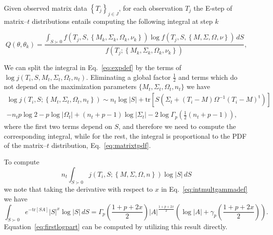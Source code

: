 \documentclass[english,listof=totoc]{scrartcl}
\begin{document}
Given observed matrix data $\left\{T_j\right\}_{j\in J}$, for each observation $T_j$ the E-step of matrix--$t$ distributions entails computing the following integral at step $k$

\begin{equation}
Q(\theta,\theta_k)=\frac{\int_{S\succ 0}f(T_{j},S,\left\{M_k,\Sigma_k,\Omega_k,\nu_k\right\})\log f\left(T_{j},S,\left\{M,\Sigma,\Omega,\nu\right\}\right)\,dS}{f(T_j;\left\{M_k,\Sigma_k,\Omega_k,\nu_k\right\})},\label{eq:expdef}
\end{equation}

We can split the integral in Eq.~\eqref{eq:expdef} by the terms of $\log j(T_{i},S,M_{t},\Sigma_{t},\Omega_{t},n_{t})$. Eliminating a global factor $\frac{1}{2}$ and terms which do not depend on the
maximization parameters $\{M_{t},\Sigma_{t},\Omega_{t},n_{t}\}$ we have
\begin{equation}
\begin{split}\log j(T_{i},S;\left\{M_{t},\Sigma_{t},\Omega_{t},n_{t}\right\})\sim n_{t}\log|S|+\textrm{tr}\left[S(\Sigma_{t}+(T_{i}-M)\Omega^{-1}(T_{i}-M)^{\textrm{t}})\right]\\
-n_{t}p\log2-p\log |\Omega_{t}|+(n_{t}+p-1)\log |\Sigma_{t}|-2\log\Gamma_{p}(\frac{1}{2}(n_{t}+p-1)),
\end{split}
\end{equation}
where the first two terms depend on $S$, and therefore we need to compute the corresponding integral, while for the rest, the integral is proportional to the PDF of the matrix--$t$ distribution, Eq.~\eqref{eq:matrixtpdf}.

To compute
\begin{equation}
n_{t}\int_{S\succ 0}j(T_{i},S;\left\{M,\Sigma,\Omega,n\right\})\log |S|\,dS\label{eq:firstlogpart}
\end{equation}
we note that taking the derivative with respect to $x$ in Eq.~\eqref{eq:intmultgammadef} we have
\begin{equation}
\int_{S\succ 0}e^{-\textrm{tr}\left[SA\right]}|S|^{x}\log |S|\,dS=\Gamma_{p}\left(\frac{1+p+2x}{2}\right)|A|^{\frac{1+p+2x}{2}}(\log |A|+\gamma_{p}\left(\frac{1+p+2x}{2}\right)).\label{eq:intderivative}
\end{equation}
Equation~\eqref{eq:firstlogpart} can be computed by utilizing this result directly.
\end{document}
